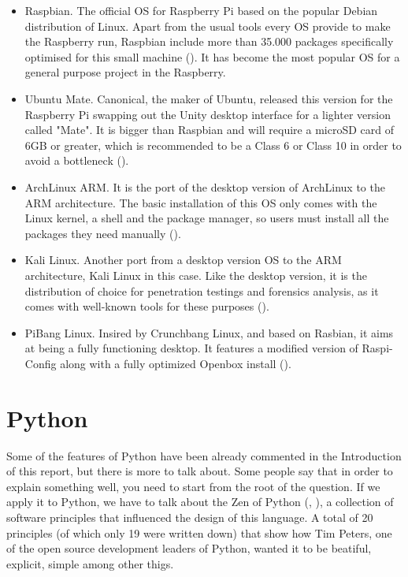 	\begin{itemize}
		\item Raspbian. The official OS for Raspberry Pi based on the popular Debian distribution of Linux. Apart from the usual tools every OS provide to make the Raspberry run, Raspbian include more than 35.000 packages specifically optimised for this small machine (\cite{raspbian_main_website}). It has become the most popular OS for a general purpose project in the Raspberry. 
		\item Ubuntu Mate. Canonical, the maker of Ubuntu, released this version for the Raspberry Pi swapping out the Unity desktop interface for a lighter version called "Mate". It is bigger than Raspbian and will require a microSD card of 6GB or greater, which is recommended to be a Class 6 or Class 10 in order to avoid a bottleneck (\cite{ubuntu_mate_review}).
		\item ArchLinux ARM. It is the port of the desktop version of ArchLinux to the ARM architecture. The basic installation of this OS only comes with the Linux kernel, a shell and the package manager, so users must install all the packages they need manually (\cite{archlinux_arm_main_website}).
		\item Kali Linux. Another port from a desktop version OS to the ARM architecture, Kali Linux in this case. Like the desktop version, it is the distribution of choice for penetration testings and forensics analysis, as it comes with well-known tools for these purposes (\cite{kalilinux_website}).
		\item PiBang Linux. Insired by Crunchbang Linux, and based on Rasbian, it aims at being a fully functioning desktop. It features a modified version of Raspi-Config along with a fully optimized Openbox install (\cite{pibang_website}).
	\end{itemize} 

\section{Python}
\label{sec:python}
Some of the features of Python have been already commented in the Introduction of this report, but there is more to talk about. Some people say that in order to explain something well, you need to start from the root of the question. If we apply it to Python, we have to talk about the Zen of Python (\cite{origin_zen_of_python}, \cite{zen_of_python}), a collection of software principles that influenced the design of this language. A total of 20 principles (of which only 19 were written down) that show how Tim Peters, one of the open source development leaders of Python, wanted it to be beatiful, explicit, simple among other thigs.

